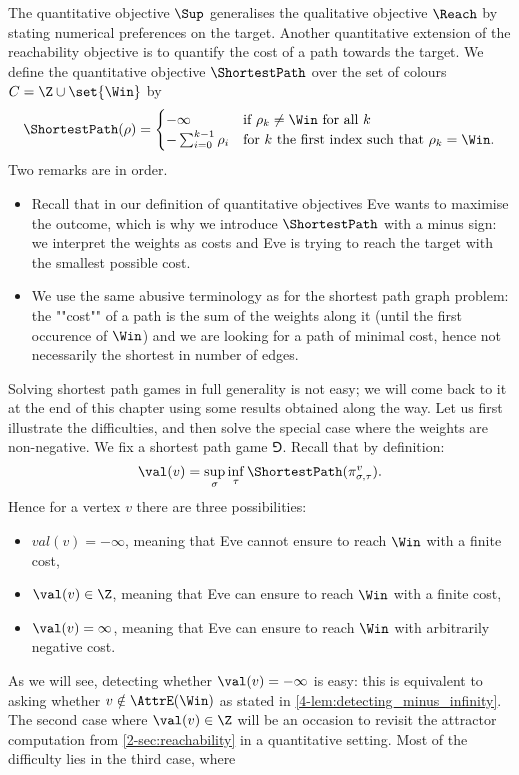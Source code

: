 The quantitative objective $\Sup$ generalises the qualitative
objective $\Reach$ by stating numerical preferences on the target. 
Another quantitative extension of the reachability objective is to quantify the cost of a path towards the target.
We define the quantitative objective $\ShortestPath$ over the set of colours $C = \Z \cup \set{\Win}$ by
\[
\ShortestPath(\rho) =
  \begin{cases}
    - \infty & \text{if } \rho_k \neq \Win \text{ for all } k \\
    - \sum_{i = 0}^{k-1} \rho_i & \text{for $k$ the first index such that } \rho_k = \Win.
  \end{cases}
\]
Two remarks are in order.
\begin{itemize}
	\item Recall that in our definition of quantitative objectives Eve wants to maximise the outcome,
which is why we introduce $\ShortestPath$ with a minus sign:
we interpret the weights as costs and Eve is trying to reach the target with the smallest possible cost.
	\item We use the same abusive terminology as for the shortest path graph problem: the ""cost"" of a path is the sum of the weights along it
(until the first occurence of $\Win$) and we are looking for a path of minimal cost, hence not necessarily the shortest in number of edges.
\end{itemize}

Solving shortest path games in full generality is not easy; we will come back to it at the end of this chapter using some results obtained along the way.
Let us first illustrate the difficulties, and then solve the special case where the weights are non-negative.
We fix a shortest path game $\Game$.
Recall that by definition:
\[
\val(v) = \sup_{\sigma} \inf_{\tau} \ShortestPath(\pi^v_{\sigma,\tau}).
\]
Hence for a vertex $v$ there are three possibilities: 
\begin{itemize}
	\item $val(v) = -\infty$, meaning that Eve cannot ensure to reach $\Win$ with a finite cost,
	\item $\val(v) \in \Z$, meaning that Eve can ensure to reach $\Win$ with a finite cost,
	\item $\val(v) = \infty$, meaning that Eve can ensure to reach $\Win$ with arbitrarily negative cost.
\end{itemize}
As we will see, detecting whether $\val(v) = -\infty$ is easy: this is equivalent to asking whether 
$v \notin \AttrE(\Win)$ as stated in \cref{4-lem:detecting_minus_infinity}.
The second case where $\val(v) \in \Z$ will be an occasion to revisit the attractor computation from \cref{2-sec:reachability}
in a quantitative setting.
Most of the difficulty lies in the third case, where 


